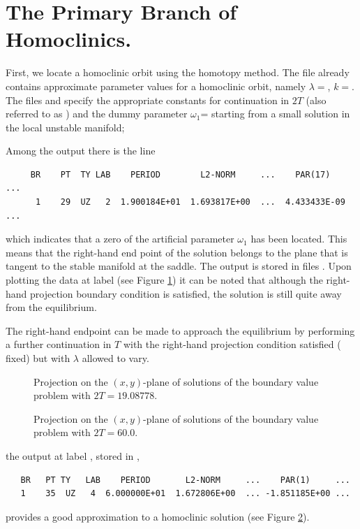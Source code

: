 \documentclass[12pt]{report}
\begin{document}
\section{The Primary Branch of Homoclinics.}
First, we locate a homoclinic orbit using 
the homotopy method. The file  
already contains 
approximate parameter values for a homoclinic orbit, 
namely $\lambda=$, $k=$. 
The files  and  specify the appropriate
constants for continuation in $2T$ (also referred
to as ) and the dummy parameter $\omega_1$=
starting
from a small solution in the local unstable manifold; 
\begin{center}
\end{center}
Among the output there is the line
\begin{verbatim}
     BR    PT  TY LAB    PERIOD        L2-NORM     ...    PAR(17)    ...
      1    29  UZ   2  1.900184E+01  1.693817E+00  ...  4.433433E-09 ... 
\end{verbatim}
which indicates that a zero of the artificial parameter $\omega_1$
has been located. This means that the right-hand end point of the solution
belongs to the plane that is tangent to the stable manifold at the saddle. 
The output is stored in files . 
Upon plotting the data at label  (see Figure \ref{kf.1a})
it can be noted that although the right-hand projection boundary
condition is satisfied, the solution is still quite away from the
equilibrium. 

The right-hand endpoint can be made to approach the
equilibrium by performing a further continuation in $T$ with the
right-hand projection condition satisfied ( fixed) but
with $\lambda$ allowed to vary. 
%
\begin{figure}[p]
\epsfysize 9.0cm
\centerline{}
\caption{Projection on the $(x,y)$-plane of solutions 
of the boundary value 
problem with $2T=19.08778$.}
\label{kf.1a}
\end{figure}
\begin{figure}[p]
\epsfysize 9.0cm
\centerline{}
\caption{Projection on the $(x,y)$-plane of solutions of the 
boundary value problem with $2T = 60.0$.}
\label{kf.1b}
\end{figure}
%
\begin{center}
\end{center}
the output at label , stored in ,
\begin{verbatim}
   BR   PT TY   LAB    PERIOD       L2-NORM     ...    PAR(1)     ...
   1    35  UZ   4  6.000000E+01  1.672806E+00  ... -1.851185E+00 ...
\end{verbatim}
provides a good approximation to a homoclinic solution (see Figure
\ref{kf.1b}). 
\end{document}
